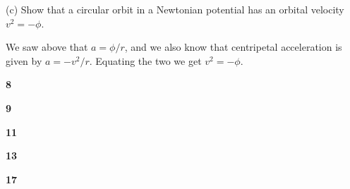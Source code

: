\documentclass[gr-notes.tex]{subfiles}
\begin{document}
(c) Show that a circular orbit in a Newtonian potential has an orbital velocity $v^2 = -\phi$.

We saw above that $a = \phi / r$, and we also know that centripetal acceleration is given by $a = -v^2 / r$. Equating the two we get $v^2 = -\phi$.




\textbf{8}

\textbf{9}

\textbf{11}

\textbf{13}

\textbf{17}
\end{document}
